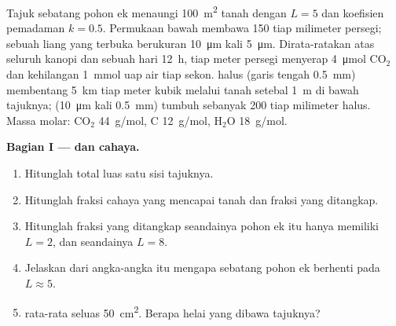 \begin{problem}
\label{pb:b1:flowering-plant-organization:1}
Tajuk sebatang pohon ek menaungi \qty{100}{m^2} tanah dengan  $L = 5$ dan koefisien pemadaman $k = 0.5$. Permukaan bawah 
membawa \qty{150}{}  tiap milimeter persegi; sebuah liang 
yang terbuka berukuran \qty{10}{\micro m} kali \qty{5}{\micro m}.
Dirata-ratakan atas seluruh kanopi dan sebuah hari \qty{12}{h}, tiap
meter persegi  menyerap \qty{4}{\micro mol} $\mathrm{CO_2}$ dan
kehilangan \qty{1}{mmol} uap air tiap sekon.  halus (garis tengah
\qty{0.5}{mm}) membentang \qty{5}{km} tiap meter kubik melalui tanah
setebal \qty{1}{m} di bawah tajuknya;  (\qty{10}{\micro m}
kali \qty{0.5}{mm}) tumbuh sebanyak \qty{200}{} tiap milimeter 
halus. Massa molar:
$\mathrm{CO_2}$ \qty{44}{g/mol}, C \qty{12}{g/mol},
$\mathrm{H_2O}$ \qty{18}{g/mol}.

\medskip
\noindent\textbf{Bagian I ---  dan cahaya.}
\begin{enumerate}
  \item Hitunglah total luas  satu sisi tajuknya.
  \item Hitunglah fraksi cahaya yang mencapai tanah dan fraksi yang
        ditangkap.
  \item Hitunglah fraksi yang ditangkap seandainya pohon ek itu hanya
        memiliki $L = 2$, dan seandainya $L = 8$.
  \item Jelaskan dari angka-angka itu mengapa sebatang pohon ek
        berhenti pada $L \approx 5$.
  \item {} rata-rata seluas \qty{50}{cm^2}. Berapa helai  yang
        dibawa tajuknya?
\end{enumerate}


\end{problem}
